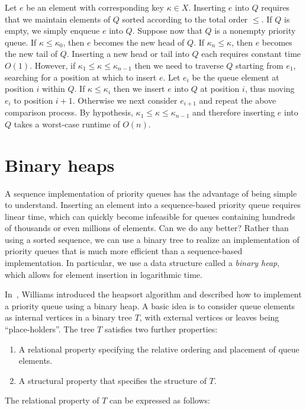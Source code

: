 Let $e$ be an element with corresponding key $\kappa \in X$. Inserting
$e$ into $Q$ requires that we maintain elements of $Q$ sorted
according to the total order $\leq$. If $Q$ is empty, we simply
enqueue $e$ into $Q$. Suppose now that $Q$ is a nonempty priority
queue. If $\kappa \leq \kappa_0$, then $e$ becomes the new head of
$Q$. If $\kappa_n \leq \kappa$, then $e$ becomes the new tail of
$Q$. Inserting a new head or tail into $Q$ each requires constant time
$O(1)$. However, if $\kappa_1 \leq \kappa \leq \kappa_{n-1}$ then we
need to traverse $Q$ starting from $e_1$, searching for a position at
which to insert $e$. Let $e_i$ be the queue element at position $i$
within $Q$. If $\kappa \leq \kappa_i$ then we insert $e$ into $Q$ at
position $i$, thus moving $e_i$ to position $i + 1$. Otherwise we next
consider $e_{i+1}$ and repeat the above comparison process. By
hypothesis, $\kappa_1 \leq \kappa \leq \kappa_{n-1}$ and therefore
inserting $e$ into $Q$ takes a worst-case runtime of $O(n)$.



\section{Binary heaps}
\label{sec:tree_data_structures:binary_heaps}

A sequence implementation of priority queues has the advantage of
being simple to understand. Inserting an element into a sequence-based
priority queue requires linear time, which can quickly become
infeasible for queues containing hundreds of thousands or even
millions of elements. Can we do any better? Rather than using a sorted
sequence, we can use a binary tree to realize an implementation of
priority queues that is much more efficient than a sequence-based
implementation. In particular, we use a data structure called a
\emph{binary heap}, which allows for element
insertion in logarithmic time.

In~\cite{Williams1964}, Williams introduced
the heapsort algorithm and described how to implement
a priority queue using a binary heap. A basic idea
is to consider queue elements as internal vertices in a binary tree
$T$, with external vertices or leaves being ``place-holders''. The
tree $T$ satisfies two further properties:
\begin{enumerate}
\item A relational property specifying the relative ordering and
  placement of queue elements.

\item A structural property that specifies the structure of $T$.
\end{enumerate}
The relational property of $T$ can be expressed as follows:

